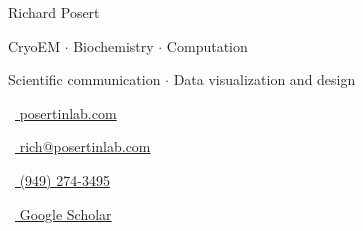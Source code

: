 \documentclass{prometheus_cv}
\begin{document}
\thispagestyle{empty}					%
\pagestyle{fancy}			 		%

\centering 

\begin{Large} 
   Richard Posert
\end{Large}

\vspace*{0.25em}
\begin{scshape}
   \begin{footnotesize}
		 \textcolor{highlight2}{CryoEM $\cdot$ Biochemistry $\cdot$ Computation}
		 
		 \vspace*{-1ex}
		 \textcolor{highlight2}{Scientific communication $\cdot$ Data visualization and design}
   \end{footnotesize}
\end{scshape}
\vspace*{0.25em}

\begin{footnotesize}
   \begin{tiny}\faHome\end{tiny}~\href{https://resume.posertinlab.com}{
	   posertinlab.com
   }
   \quad \begin{tiny}\faEnvelope[regular]\end{tiny}~\href{mailto:rich@posertinlab.com}{%
	   rich@posertinlab.com
   } 
   \quad \begin{tiny}\faMobile*\end{tiny}~\href{tel:9492743495}{
	   (949) 274-3495
   }
   \quad \begin{tiny}\faGraduationCap\end{tiny}~\href{https://scholar.google.com/citations?user=eNNSP4gAAAAJ&hl=en}{
		Google Scholar
	   }

\end{footnotesize}

\end{document}
